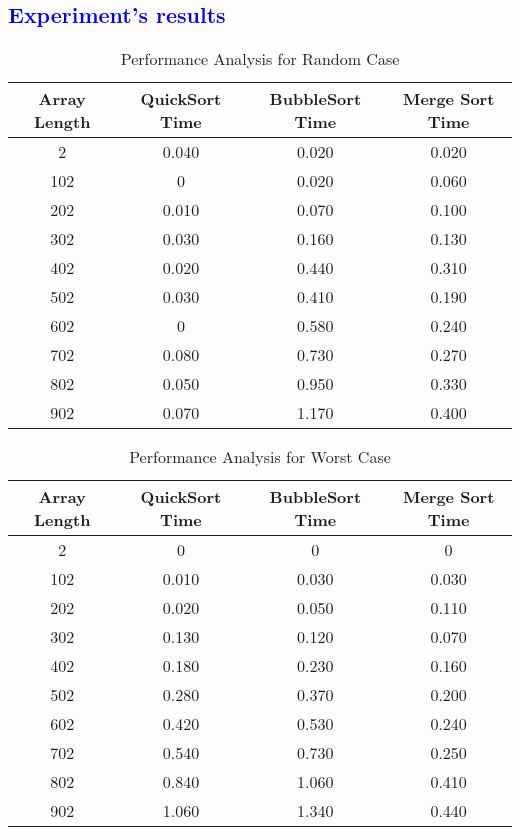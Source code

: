 \textcolor{blue}{\section{Experiment's results}}
\begin{table}[h!]
\centering
\caption{Performance Analysis for Random Case}
\label{table:random_case}
\begin{tabular}{@{}cccc@{}}
\toprule
Array Length & QuickSort Time & BubbleSort Time & Merge Sort Time \\
\midrule
2 & 0.040 & 0.020 & 0.020 \\
102 & 0 & 0.020 & 0.060 \\
202 & 0.010 & 0.070 & 0.100 \\
302 & 0.030 & 0.160 & 0.130 \\
402 & 0.020 & 0.440 & 0.310 \\
502 & 0.030 & 0.410 & 0.190 \\
602 & 0 & 0.580 & 0.240 \\
702 & 0.080 & 0.730 & 0.270 \\
802 & 0.050 & 0.950 & 0.330 \\
902 & 0.070 & 1.170 & 0.400 \\
\bottomrule
\end{tabular}
\end{table}

\begin{table}[h!]
\centering
\caption{Performance Analysis for Worst Case}
\label{table:worst_case}
\begin{tabular}{@{}cccc@{}}
\toprule
Array Length & QuickSort Time & BubbleSort Time & Merge Sort Time \\
\midrule
2 & 0 & 0 & 0 \\
102 & 0.010 & 0.030 & 0.030 \\
202 & 0.020 & 0.050 & 0.110 \\
302 & 0.130 & 0.120 & 0.070 \\
402 & 0.180 & 0.230 & 0.160 \\
502 & 0.280 & 0.370 & 0.200 \\
602 & 0.420 & 0.530 & 0.240 \\
702 & 0.540 & 0.730 & 0.250 \\
802 & 0.840 & 1.060 & 0.410 \\
902 & 1.060 & 1.340 & 0.440 \\
\bottomrule
\end{tabular}
\end{table}

